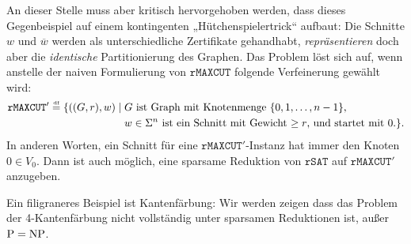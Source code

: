 An dieser Stelle muss aber kritisch hervorgehoben werden, dass dieses Gegenbeispiel auf einem kontingenten „Hütchenspielertrick“ aufbaut: Die Schnitte $w$ und $\overline{w}$ werden als unterschiedliche Zertifikate gehandhabt, \emph{repräsentieren} doch aber die \emph{identische} Partitionierung des Graphen.
Das Problem löst sich auf, wenn anstelle der naiven Formulierung von $\mathtt{rMAXCUT}$ folgende Verfeinerung gewählt wird:
\[ \begin{split} \mathtt{rMAXCUT'} \stackrel{\text{\smash{\tiny df}}}{=} \{ ((G, r), w) \mid {}&\text{$G$ ist Graph mit Knotenmenge $\{0,1,\dots,n-1\}$,} \\ &\text{$w\in\Sigma^n$ ist ein Schnitt mit Gewicht $\geq r$, und startet mit $0$.} \}.\end{split} \]
In anderen Worten, ein Schnitt für eine $\mathtt{rMAXCUT'}$-Instanz hat immer den Knoten $0\in V_0$.
Dann ist auch möglich, eine sparsame Reduktion von $\mathtt{rSAT}$ auf $\mathtt{rMAXCUT'}$ anzugeben.

Ein filigraneres Beispiel ist Kantenfärbung:  Wir werden zeigen dass das Problem der 4-Kantenfärbung nicht vollständig unter sparsamen Reduktionen ist, außer $\mathrm{P}=\mathrm{NP}$.


